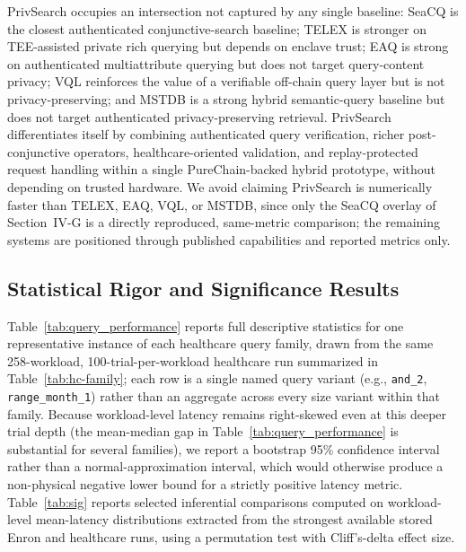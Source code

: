 PrivSearch occupies an intersection not captured by any single baseline: SeaCQ is the closest authenticated conjunctive-search baseline; TELEX is stronger on TEE-assisted private rich querying but depends on enclave trust; EAQ is strong on authenticated multiattribute querying but does not target query-content privacy; VQL reinforces the value of a verifiable off-chain query layer but is not privacy-preserving; and MSTDB is a strong hybrid semantic-query baseline but does not target authenticated privacy-preserving retrieval. PrivSearch differentiates itself by combining authenticated query verification, richer post-conjunctive operators, healthcare-oriented validation, and replay-protected request handling within a single PureChain-backed hybrid prototype, without depending on trusted hardware. We avoid claiming PrivSearch is numerically faster than TELEX, EAQ, VQL, or MSTDB, since only the SeaCQ overlay of Section~IV-G is a directly reproduced, same-metric comparison; the remaining systems are positioned through published capabilities and reported metrics only.
\subsection{Statistical Rigor and Significance Results}
\label{4I}
Table~\ref{tab:query_performance} reports full descriptive statistics for one representative instance of each healthcare query family, drawn from the same 258-workload, 100-trial-per-workload healthcare run summarized in Table~\ref{tab:hc-family}; each row is a single named query variant (e.g., \texttt{and\_2}, \texttt{range\_month\_1}) rather than an aggregate across every size variant within that family. Because workload-level latency remains right-skewed even at this deeper trial depth (the mean-median gap in Table~\ref{tab:query_performance} is substantial for several families), we report a bootstrap 95\% confidence interval rather than a normal-approximation interval, which would otherwise produce a non-physical negative lower bound for a strictly positive latency metric. Table~\ref{tab:sig} reports selected inferential comparisons computed on workload-level mean-latency distributions extracted from the strongest available stored Enron and healthcare runs, using a permutation test with Cliff's-delta effect size.

